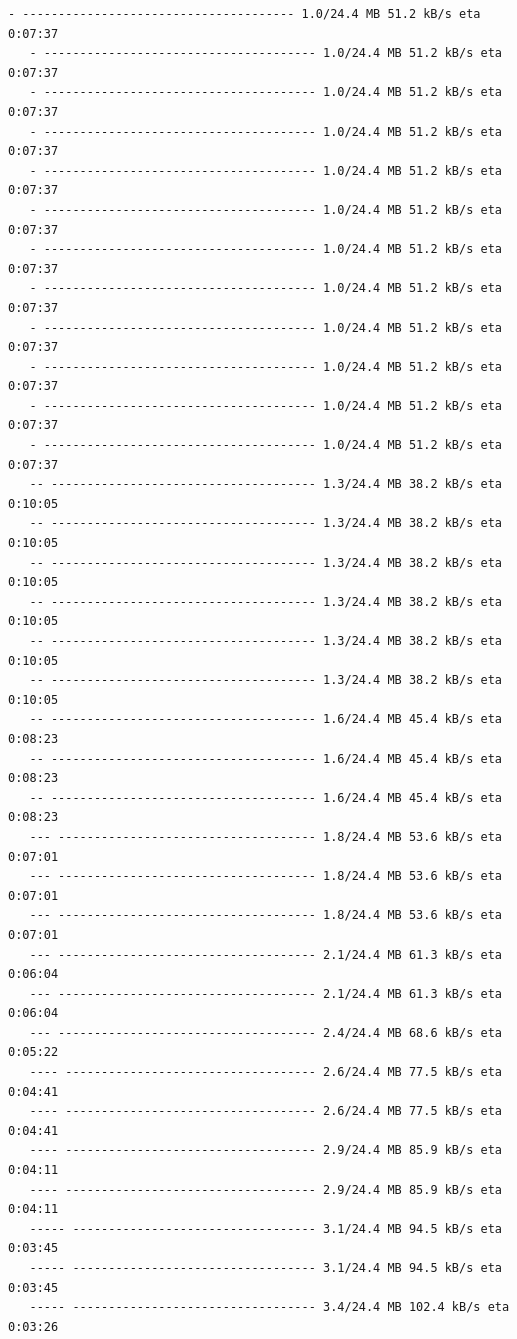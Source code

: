 \documentclass[11pt]{article}
\begin{document}
\begin{Verbatim}[commandchars=\\\{\}]
   - -------------------------------------- 1.0/24.4 MB 51.2 kB/s eta 0:07:37
   - -------------------------------------- 1.0/24.4 MB 51.2 kB/s eta 0:07:37
   - -------------------------------------- 1.0/24.4 MB 51.2 kB/s eta 0:07:37
   - -------------------------------------- 1.0/24.4 MB 51.2 kB/s eta 0:07:37
   - -------------------------------------- 1.0/24.4 MB 51.2 kB/s eta 0:07:37
   - -------------------------------------- 1.0/24.4 MB 51.2 kB/s eta 0:07:37
   - -------------------------------------- 1.0/24.4 MB 51.2 kB/s eta 0:07:37
   - -------------------------------------- 1.0/24.4 MB 51.2 kB/s eta 0:07:37
   - -------------------------------------- 1.0/24.4 MB 51.2 kB/s eta 0:07:37
   - -------------------------------------- 1.0/24.4 MB 51.2 kB/s eta 0:07:37
   - -------------------------------------- 1.0/24.4 MB 51.2 kB/s eta 0:07:37
   - -------------------------------------- 1.0/24.4 MB 51.2 kB/s eta 0:07:37
   -- ------------------------------------- 1.3/24.4 MB 38.2 kB/s eta 0:10:05
   -- ------------------------------------- 1.3/24.4 MB 38.2 kB/s eta 0:10:05
   -- ------------------------------------- 1.3/24.4 MB 38.2 kB/s eta 0:10:05
   -- ------------------------------------- 1.3/24.4 MB 38.2 kB/s eta 0:10:05
   -- ------------------------------------- 1.3/24.4 MB 38.2 kB/s eta 0:10:05
   -- ------------------------------------- 1.3/24.4 MB 38.2 kB/s eta 0:10:05
   -- ------------------------------------- 1.6/24.4 MB 45.4 kB/s eta 0:08:23
   -- ------------------------------------- 1.6/24.4 MB 45.4 kB/s eta 0:08:23
   -- ------------------------------------- 1.6/24.4 MB 45.4 kB/s eta 0:08:23
   --- ------------------------------------ 1.8/24.4 MB 53.6 kB/s eta 0:07:01
   --- ------------------------------------ 1.8/24.4 MB 53.6 kB/s eta 0:07:01
   --- ------------------------------------ 1.8/24.4 MB 53.6 kB/s eta 0:07:01
   --- ------------------------------------ 2.1/24.4 MB 61.3 kB/s eta 0:06:04
   --- ------------------------------------ 2.1/24.4 MB 61.3 kB/s eta 0:06:04
   --- ------------------------------------ 2.4/24.4 MB 68.6 kB/s eta 0:05:22
   ---- ----------------------------------- 2.6/24.4 MB 77.5 kB/s eta 0:04:41
   ---- ----------------------------------- 2.6/24.4 MB 77.5 kB/s eta 0:04:41
   ---- ----------------------------------- 2.9/24.4 MB 85.9 kB/s eta 0:04:11
   ---- ----------------------------------- 2.9/24.4 MB 85.9 kB/s eta 0:04:11
   ----- ---------------------------------- 3.1/24.4 MB 94.5 kB/s eta 0:03:45
   ----- ---------------------------------- 3.1/24.4 MB 94.5 kB/s eta 0:03:45
   ----- ---------------------------------- 3.4/24.4 MB 102.4 kB/s eta 0:03:26

\end{Verbatim}
\end{document}
